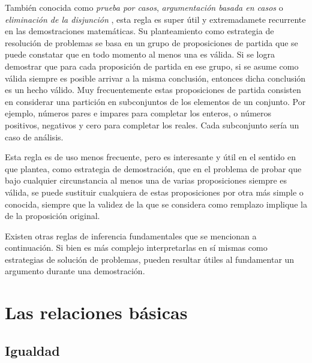 

También conocida como \textit{prueba por casos}, \textit{argumentación basada en casos} o \textit{eliminación de la disjunción} , esta regla es super útil y extremadamete recurrente en las demostraciones matemáticas. Su planteamiento como estrategia de resolución de problemas se basa en un grupo de proposiciones de partida que se puede constatar que en todo momento al menos una es válida. Si se logra demostrar que para cada proposición de partida en ese grupo, si se asume como válida siempre es posible arrivar a la misma conclusión, entonces dicha conclusión es un hecho válido. Muy frecuentemente estas proposiciones de partida consisten en considerar una partición en subconjuntos de los elementos de un conjunto. Por ejemplo, números pares e impares para completar los enteros, o números positivos, negativos y cero para completar los reales. Cada subconjunto sería un caso de análisis.



Esta regla es de uso menos frecuente, pero es interesante y útil en el sentido en que plantea, como estrategia de demostración, que en el problema de probar que bajo cualquier circunstancia al menos una de varias proposiciones siempre es válida, se puede sustituir cualquiera de estas proposiciones por otra más simple o conocida, siempre que la validez de la que se considera como remplazo implique la de la proposición original.

Existen otras reglas de inferencia fundamentales que se mencionan a continuación. Si bien es más complejo interpretarlas en sí mismas como estrategias de solución de problemas, pueden resultar útiles al fundamentar un argumento durante una demostración.











\section{Las relaciones básicas}
\subsection{Igualdad}

